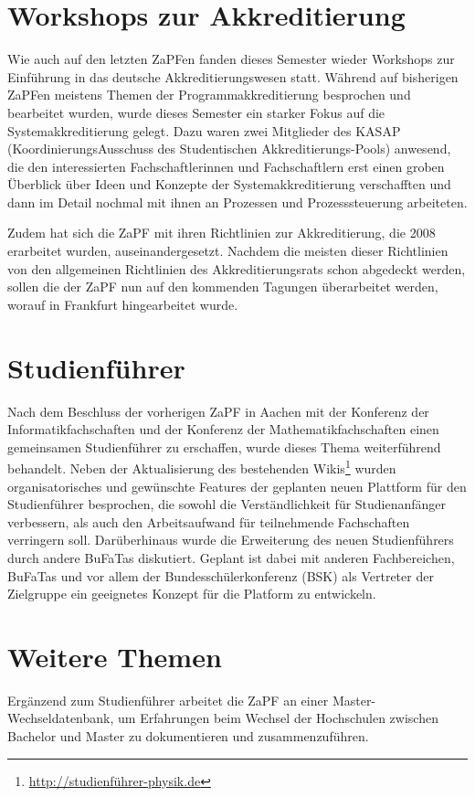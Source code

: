 \section*{Workshops zur Akkreditierung} Wie auch auf den letzten ZaPFen fanden
dieses Semester wieder Workshops zur Einführung in das deutsche
Akkreditierungswesen statt. Während auf bisherigen ZaPFen meistens Themen der
Programmakkreditierung besprochen und bearbeitet wurden, wurde dieses Semester
ein starker Fokus auf die Systemakkreditierung gelegt. Dazu waren zwei
Mitglieder des KASAP (KoordinierungsAusschuss des Studentischen
Akkreditierungs-Pools) anwesend, die den interessierten Fachschaftlerinnen und
Fachschaftlern erst einen groben Überblick über Ideen und Konzepte der
Systemakkreditierung verschafften und dann im Detail nochmal mit ihnen an
Prozessen und Prozesssteuerung arbeiteten.

Zudem hat sich die ZaPF mit ihren Richtlinien zur Akkreditierung, die 2008
erarbeitet wurden, auseinandergesetzt. Nachdem die meisten dieser Richtlinien
von den allgemeinen Richtlinien des Akkreditierungsrats schon abgedeckt werden,
sollen die der ZaPF nun auf den kommenden Tagungen überarbeitet werden, worauf
in Frankfurt hingearbeitet wurde.

\section*{Studienführer}
Nach dem Beschluss der vorherigen ZaPF in Aachen mit der Konferenz der
Informatikfachschaften und der Konferenz der Mathematikfachschaften einen
gemeinsamen Studienführer zu  erschaffen, wurde dieses Thema weiterführend
behandelt. Neben der Aktualisierung des bestehenden
Wikis\footnote{\url{http://studienführer-physik.de}} wurden organisatorisches
und gewünschte Features der geplanten neuen Plattform für den Studienführer
besprochen, die sowohl die Verständlichkeit für Studienanfänger verbessern, als
auch den Arbeitsaufwand für teilnehmende Fachschaften verringern soll.
Darüberhinaus wurde die Erweiterung des neuen Studienführers durch andere
BuFaTas diskutiert. Geplant ist dabei  mit anderen Fachbereichen, BuFaTas und
vor allem der Bundesschülerkonferenz (BSK) als Vertreter der Zielgruppe ein
geeignetes Konzept für die Platform zu entwickeln.

\section*{Weitere Themen}
Ergänzend zum Studienführer arbeitet die ZaPF an einer Master-Wechseldatenbank, um Erfahrungen beim Wechsel der Hochschulen zwischen Bachelor und Master zu dokumentieren und zusammenzuführen.


